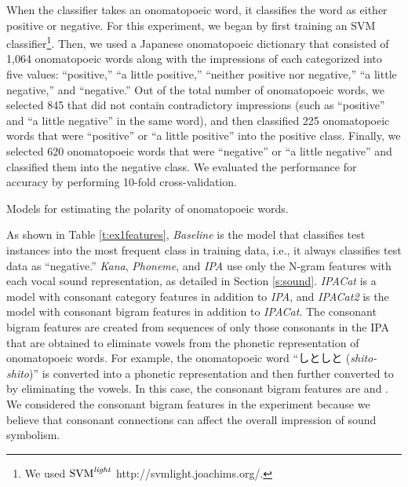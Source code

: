 \documentclass[english]{jnlp_1.4}
\begin{document}
When the classifier takes an onomatopoeic word, it classifies the word as either positive or negative.
For this experiment, we began by first training an SVM classifier\footnote{We used ${\rm SVM}^{{\it light}}$ http://svmlight.joachims.org/.}.
Then, we used a Japanese onomatopoeic dictionary \cite{hida2002}
that consisted of 1,064 onomatopoeic words along with the impressions of each categorized into five values:
``positive,'' ``a little positive,'' ``neither positive nor negative,'' ``a little negative,'' and ``negative.''
Out of the total number of onomatopoeic words, we selected 845 that did not contain contradictory impressions (such as ``positive'' and ``a little negative'' in the same word), and then
classified 225 onomatopoeic words that were ``positive'' or ``a little positive'' into the positive class.
Finally, we selected 620 onomatopoeic words that were ``negative'' or ``a little negative'' and classified them into the negative class.
We evaluated the performance for accuracy by performing 10-fold cross-validation.

\begin{table}[b]
\caption{Models for estimating the polarity of onomatopoeic words.}
\label{t:ex1features}

\end{table}

As shown in Table \ref{t:ex1features}, {\it Baseline} is the model that classifies test instances into the most frequent class in training data, i.e., it always classifies test data as ``negative.''
{\it Kana}, {\it Phoneme}, and {\it IPA} use only the N-gram features with each vocal sound representation, as detailed in Section \ref{s:sound}.
{\it IPACat} is a model with consonant category features in addition to {\it IPA}, and {\it IPACat2} is the model with consonant bigram features in addition to {\it IPACat}.
The consonant bigram features are created from sequences of only those consonants in the IPA that are obtained to eliminate vowels from the phonetic representation of onomatopoeic words.
For example, the onomatopoeic word ``しとしと ({\it shito-shito})'' is converted into a phonetic representation \textipa{[SitoSito]} and then further converted to \textipa{[StSt]} by eliminating the vowels.
In this case, the consonant bigram features are \textipa{[St]} and \textipa{[tS]}.
We considered the consonant bigram features in the experiment because we believe that consonant connections can affect the overall impression of sound symbolism.
\end{document}
